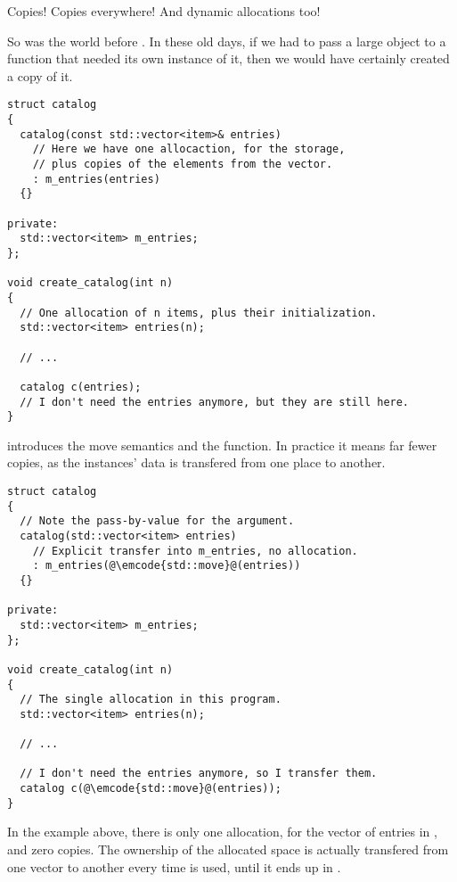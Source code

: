 \label{move}

\problemtitle

Copies! Copies everywhere! And dynamic allocations too!

So was the world before . In these old days, if we had to pass
a large object to a function that needed its own instance of it, then
we would have certainly created a copy of it.

\begin{lstlisting}
struct catalog
{
  catalog(const std::vector<item>& entries)
    // Here we have one allocaction, for the storage,
    // plus copies of the elements from the vector.
    : m_entries(entries)
  {}

private:
  std::vector<item> m_entries;
};

void create_catalog(int n)
{
  // One allocation of n items, plus their initialization.
  std::vector<item> entries(n);

  // ...

  catalog c(entries);
  // I don't need the entries anymore, but they are still here.
}
\end{lstlisting}

\solutiontitle

%
%
 introduces the move semantics and the 
function. In practice it means far fewer copies, as the instances'
data is transfered from one place to another.

\begin{lstlisting}
struct catalog
{
  // Note the pass-by-value for the argument.
  catalog(std::vector<item> entries)
    // Explicit transfer into m_entries, no allocation.
    : m_entries(@\emcode{std::move}@(entries))
  {}

private:
  std::vector<item> m_entries;
};

void create_catalog(int n)
{
  // The single allocation in this program.
  std::vector<item> entries(n);

  // ...

  // I don't need the entries anymore, so I transfer them.
  catalog c(@\emcode{std::move}@(entries));
}
\end{lstlisting}

In the example above, there is only one allocation, for the vector of
entries in , and zero copies. The ownership of
the allocated space is actually transfered from one vector to another
every time  is used, until it ends up
in .

